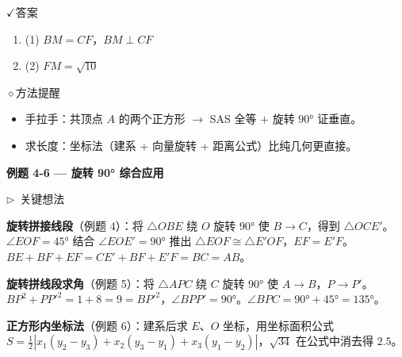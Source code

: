 \documentclass{exam-zh}
\newcommand{\edukai}{\kaishu}
\newcommand{\eduSectionTitle}[1]{%
  \needspace{5\baselineskip}%
  \vspace{2mm}
  {\color{edu-blue}\bfseries\large #1}\par
  \vspace{3mm}
}
\newenvironment{eduAuxItem}[1]{%
  \needspace{4\baselineskip}%
  \vspace{2mm}
  \par\noindent
  \hangindent=8mm\hangafter=1
  {\color{edu-blue}\edukai $\triangleright$~#1}\enspace
  \begingroup
  \color{edu-ink}
  \edukai
}{%
  \endgroup
  \par
  \vspace{4mm}
}
\newcommand{\eduIconCheck}{\(\checkmark\)}
\newcommand{\eduIconPin}{\(\diamond\)}
\newenvironment{eduBulletList}{%
  \begin{itemize}[
    label=\textbullet,
    leftmargin=5mm,
    itemsep=1.2mm,
    topsep=0pt,
    parsep=0pt
  ]
}{%
  \end{itemize}
}
\newenvironment{eduBottomGrid}{%
  \vspace{1mm}
  \par\noindent
}{%
  \par\vspace{1mm}
}
\newenvironment{eduSummaryLeft}{%
  \begin{minipage}[t]{0.30\linewidth}
}{%
  \end{minipage}
}
\newcommand{\eduSummaryDivider}{%
  \hspace{4mm}{\color{edu-line}\vrule width 0.35pt}\hspace{7mm}%
}
\newenvironment{eduSummaryRight}{%
  \begin{minipage}[t]{0.58\linewidth}
}{%
  \end{minipage}
}
\newenvironment{eduPlainList}{%
  \begin{enumerate}[
    label=(\arabic*),
    leftmargin=7mm,
    itemsep=1.2mm,
    topsep=0pt,
    parsep=0pt
  ]
}{%
  \end{enumerate}
}
\begin{document}
\begin{eduBottomGrid}
  \begin{eduSummaryLeft}
    \begin{eduSummaryBlock}{\eduIconCheck}{答案}
    \begin{eduPlainList}
      \item (1) $BM = CF$，$BM \perp CF$      \item (2) $FM = \sqrt{10}$    \end{eduPlainList}
    \end{eduSummaryBlock}
  \end{eduSummaryLeft}
  \eduSummaryDivider
  \begin{eduSummaryRight}
    \begin{eduSummaryBlock}{\eduIconPin}{方法提醒}
    \begin{eduBulletList}
      \item 手拉手：共顶点 $A$ 的两个正方形 $\to$ SAS 全等 $+$ 旋转 $90°$ 证垂直。      \item 求长度：坐标法（建系 + 向量旋转 + 距离公式）比纯几何更直接。    \end{eduBulletList}
    \end{eduSummaryBlock}
  \end{eduSummaryRight}
\end{eduBottomGrid}



\eduSectionTitle{例题 4-6 — 旋转 90° 综合应用}

\begin{eduAuxItem}{关键想法}
\textbf{旋转拼接线段}（例题 4）：将 $\triangle OBE$ 绕 $O$ 旋转 $90°$ 使 $B \to C$，得到 $\triangle OCE'$。$\angle EOF = 45°$ 结合 $\angle EOE' = 90°$ 推出 $\triangle EOF \cong \triangle E'OF$，$EF = E'F$。$BE + BF + EF = CE' + BF + E'F = BC = AB$。

\textbf{旋转拼线段求角}（例题 5）：将 $\triangle APC$ 绕 $C$ 旋转 $90°$ 使 $A \to B$，$P \to P'$。$BP^2 + PP'^2 = 1 + 8 = 9 = BP'^2$，$\angle BPP' = 90°$。$\angle BPC = 90° + 45° = 135°$。

\textbf{正方形内坐标法}（例题 6）：建系后求 $E$、$O$ 坐标，用坐标面积公式 $S = \frac{1}{2}|x_1(y_2-y_3) + x_2(y_3-y_1) + x_3(y_1-y_2)|$，$\sqrt{34}$ 在公式中消去得 $2.5$。
\end{eduAuxItem}
\end{document}
